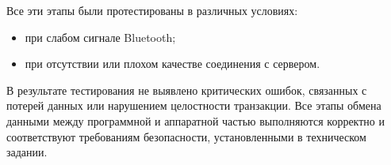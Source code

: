 Все эти этапы были протестированы в различных условиях:

\begin{itemize}
	\item при слабом сигнале Bluetooth;
	\item при отсутствии или плохом качестве соединения с сервером.
\end{itemize}

В результате тестирования не выявлено критических ошибок, связанных с потерей данных или нарушением целостности транзакции.
Все этапы обмена данными между программной и аппаратной частью выполняются корректно и соответствуют требованиям безопасности, установленными в техническом задании.






%
